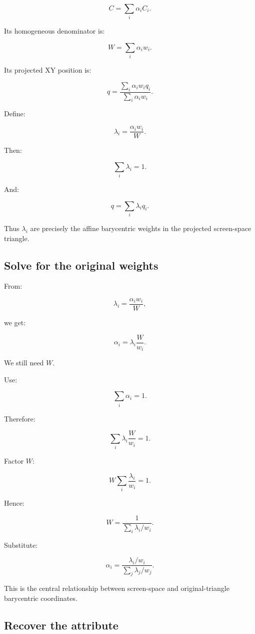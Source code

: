 \[
 \boxed{ C=\sum_i\alpha_iC_i }.
\]

Its homogeneous denominator is:

\[
 \boxed{ W=\sum_i\alpha_iw_i }.
\]

Its projected XY position is:

\[
 q= \frac{ \sum_i\alpha_iw_iq_i }{ \sum_i\alpha_iw_i }.
\]

Define:

\[
 \boxed{ \lambda_i=\frac{\alpha_iw_i}{W} }.
\]

Then:

\[
 \sum_i\lambda_i=1.
\]

And:

\[
 q=\sum_i\lambda_iq_i.
\]

Thus \(\lambda_i\) are precisely the affine barycentric weights in the projected screen-space triangle.

\subsection{Solve for the original weights}\label{02-foundations-ii-ch034-solve-for-the-original-weights}

\hypertarget{02-foundations-ii-ch034-solve-for-the-original-weights}{}

From:

\[
 \lambda_i=\frac{\alpha_iw_i}{W},
\]

we get:

\[
 \alpha_i=\lambda_i\frac W{w_i}.
\]

We still need \(W\).

Use:

\[
 \sum_i\alpha_i=1.
\]

Therefore:

\[
 \sum_i\lambda_i\frac W{w_i}=1.
\]

Factor \(W\):

\[
 W\sum_i\frac{\lambda_i}{w_i}=1.
\]

Hence:

\[
 \boxed{ W= \frac1{\sum_i\lambda_i/w_i} }.
\]

Substitute:

\[
 \boxed{ \alpha_i= \frac{\lambda_i/w_i} {\sum_j\lambda_j/w_j} }.
\]

This is the central relationship between screen-space and original-triangle barycentric coordinates.

\subsection{Recover the attribute}\label{02-foundations-ii-ch034-recover-the-attribute}

